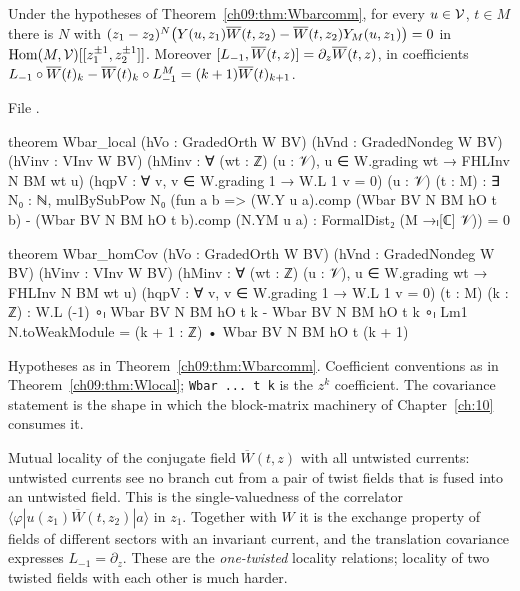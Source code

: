 \begin{theorem}\label{ch09:thm:Wbarlocal}
Under the hypotheses of Theorem~\ref{ch09:thm:Wbarcomm}, for every $u\in\mathcal{V}$, $t\in M$ there is $N$
with $(z_1-z_2)^N\big(Y(u,z_1)\overline{W}(t,z_2)-\overline{W}(t,z_2)Y_M(u,z_1)\big)=0$ in
$\operatorname{Hom}(M,\mathcal{V})[[z_1^{\pm1},z_2^{\pm1}]]$. Moreover
$[L_{-1},\overline{W}(t,z)]=\partial_z\overline{W}(t,z)$, in coefficients
$L_{-1}\circ\overline{W}(t)_k-\overline{W}(t)_k\circ L_{-1}^M=(k+1)\overline{W}(t)_{k+1}$.
\end{theorem}
\noindent File .
\begin{leancode}
theorem Wbar_local (hVo : GradedOrth W BV) (hVnd : GradedNondeg W BV)
    (hVinv : VInv W BV) (hMinv : ∀ (wt : ℤ) (u : 𝒱), u ∈ W.grading wt → FHLInv N BM wt u)
    (hqpV : ∀ v, v ∈ W.grading 1 → W.L 1 v = 0) (u : 𝒱) (t : M) :
    ∃ N₀ : ℕ, mulBySubPow N₀
      (fun a b => (W.Y u a).comp (Wbar BV N BM hO t b) - (Wbar BV N BM hO t b).comp (N.YM u a) :
        FormalDist₂ (M →ₗ[ℂ] 𝒱)) = 0

theorem Wbar_homCov (hVo : GradedOrth W BV) (hVnd : GradedNondeg W BV)
    (hVinv : VInv W BV) (hMinv : ∀ (wt : ℤ) (u : 𝒱), u ∈ W.grading wt → FHLInv N BM wt u)
    (hqpV : ∀ v, v ∈ W.grading 1 → W.L 1 v = 0) (t : M) (k : ℤ) :
    W.L (-1) ∘ₗ Wbar BV N BM hO t k - Wbar BV N BM hO t k ∘ₗ Lm1 N.toWeakModule
      = (k + 1 : ℤ) • Wbar BV N BM hO t (k + 1)
\end{leancode}
\begin{dictionary}
Hypotheses as in Theorem~\ref{ch09:thm:Wbarcomm}. Coefficient conventions as in
Theorem~\ref{ch09:thm:Wlocal}; \texttt{Wbar ... t k} is the $z^k$ coefficient. The covariance
statement is the shape in which the block-matrix machinery of Chapter~\ref{ch:10} consumes it.
\end{dictionary}
\begin{physics}
Mutual locality of the conjugate field $\overline W(t,z)$ with all untwisted currents: untwisted currents see no branch cut from a pair of twist fields that is fused into an untwisted field. This is the single-valuedness of the correlator $\langle\varphi|u(z_1)\overline W(t,z_2)|a\rangle$ in $z_1$. Together with $W$ it is the exchange property of fields of different sectors with an invariant current, and the translation covariance expresses $L_{-1}=\partial_z$. These are the \emph{one-twisted} locality relations; locality of two twisted fields with each other is much harder.
\end{physics}

